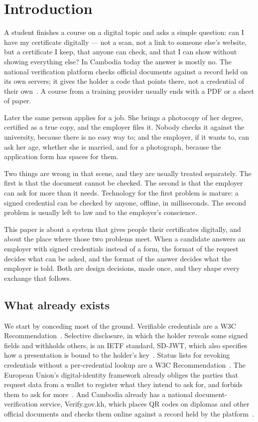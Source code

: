 \documentclass[10pt,a4paper,twocolumn]{article}
\begin{document}
\section{Introduction}
\label{sec:intro}

A student finishes a course on a digital topic and asks a simple question: can I
have my certificate digitally --- not a scan, not a link to someone else's
website, but a certificate I keep, that anyone can check, and that I can show
without showing everything else? In Cambodia today the answer is mostly no. The
national verification platform checks official documents against a record held
on its own servers; it gives the holder a code that points there, not a
credential of their own~\citep{verifygovkh,chay2026qrseal}. A course from a
training provider usually ends with a PDF or a sheet of paper.

Later the same person applies for a job. She brings a photocopy of her
degree, certified as a true copy, and the employer files it. Nobody checks it
against the university, because there is no easy way to; and the employer, if
it wants to, can ask her age, whether she is married, and for a photograph,
because the application form has spaces for them.

Two things are wrong in that scene, and they are usually treated separately.
The first is that the document cannot be checked. The second is that the
employer can ask for more than it needs. Technology for the first problem is
mature: a signed credential can be checked by anyone, offline, in milliseconds.
The second problem is usually left to law and to the employer's conscience.

This paper is about a system that gives people their certificates digitally,
and about the place where those two problems meet. When a candidate answers an
employer with signed credentials instead of a form, the format of the request
decides what can be asked, and the format of the answer decides what the
employer is told. Both are design decisions, made once, and they shape every
exchange that follows.

\subsection{What already exists}

We start by conceding most of the ground. Verifiable credentials are a W3C
Recommendation~\citep{vcdm2}. Selective disclosure, in which the holder reveals
some signed fields and withholds others, is an IETF standard, SD-JWT, which also
specifies how a presentation is bound to the holder's key~\citep{rfc9901,rfc7800}.
Status lists for revoking credentials without a per-credential lookup are a W3C
Recommendation~\citep{bitstring}. The European Union's digital-identity framework
already obliges the parties that request data from a wallet to register what they
intend to ask for, and forbids them to ask for more~\citep{eidas2,eu2025848}. And
Cambodia already has a national document-verification service, Verify.gov.kh,
which places QR codes on diplomas and other official documents and checks them
online against a record held by the platform~\citep{verifygovkh,cambodianess2026verifygov,khmertimes2026verifygov}.
\end{document}
